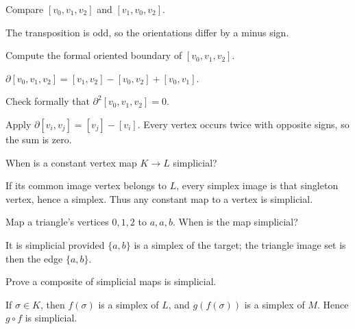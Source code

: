 \begin{problem}\label{prob:viii15-13}
Compare \([v_0,v_1,v_2]\) and \([v_1,v_0,v_2]\).
\end{problem}
\begin{solution}
The transposition is odd, so the orientations differ by a minus sign.
\end{solution}

\begin{problem}\label{prob:viii15-14}
Compute the formal oriented boundary of \([v_0,v_1,v_2]\).
\end{problem}
\begin{solution}
\(\partial[v_0,v_1,v_2]=[v_1,v_2]-[v_0,v_2]+[v_0,v_1]\).
\end{solution}

\begin{problem}\label{prob:viii15-15}
Check formally that \(\partial^2[v_0,v_1,v_2]=0\).
\end{problem}
\begin{solution}
Apply \(\partial[v_i,v_j]=[v_j]-[v_i]\). Every vertex occurs twice with opposite signs, so the sum is zero.
\end{solution}

\begin{problem}\label{prob:viii15-16}
When is a constant vertex map \(K\to L\) simplicial?
\end{problem}
\begin{solution}
If its common image vertex belongs to \(L\), every simplex image is that singleton vertex, hence a simplex. Thus any constant map to a vertex is simplicial.
\end{solution}

\begin{problem}\label{prob:viii15-17}
Map a triangle's vertices \(0,1,2\) to \(a,a,b\). When is the map simplicial?
\end{problem}
\begin{solution}
It is simplicial provided \(\{a,b\}\) is a simplex of the target; the triangle image set is then the edge \(\{a,b\}\).
\end{solution}

\begin{problem}[Composition]\label{prob:viii15-18}
Prove a composite of simplicial maps is simplicial.
\end{problem}
\begin{solution}
If \(\sigma\in K\), then \(f(\sigma)\) is a simplex of \(L\), and \(g(f(\sigma))\) is a simplex of \(M\). Hence \(g\circ f\) is simplicial.
\end{solution}

